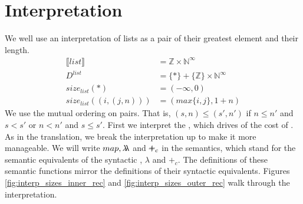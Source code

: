\section{Interpretation}
%
We well use an interpretation of lists as a pair of their greatest element and
their length.
%
\begin{align*}
   \llbracket list \rrbracket &= \mathbb{Z} \times \mathbb{N}^\infty \\
                     D^{list} &= \{\ast\} + \{\mathbb{Z}\} \times \mathbb{N}^\infty \\
            size_{list} (\ast) &= (-\infty,0) \\
  size_{list} ((i,(j,n))) &= (max\{i,j\},1 + n)
\end{align*}
%
We use the mutual ordering on pairs.  That is, $(s,n) \leq (s',n')$ if
$n \leq n'$ and $s < s'$ or $n < n'$ and $s \leq s'$.
%
First we interpret the , which drives of the cost of .  As in
the translation, we break the interpretation up to make it more manageable.  We
will write $map, \lambda\!\!\lambda$ and $\pplus_c$ in the semantics, which stand for the
semantic equivalents of the syntactic , $\lambda$ and $+_c$.  The
definitions of these semantic functions mirror the definitions of their
syntactic equivalents.  Figures \ref{fig:interp_sizes_inner_rec} and
\ref{fig:interp_sizes_outer_rec} walk through the interpretation.

